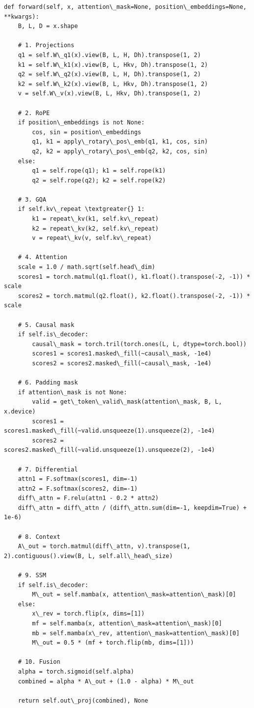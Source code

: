 \begin{lstlisting}
def forward(self, x, attention\_mask=None, position\_embeddings=None, **kwargs):
    B, L, D = x.shape
    
    # 1. Projections
    q1 = self.W\_q1(x).view(B, L, H, Dh).transpose(1, 2)
    k1 = self.W\_k1(x).view(B, L, Hkv, Dh).transpose(1, 2)
    q2 = self.W\_q2(x).view(B, L, H, Dh).transpose(1, 2)
    k2 = self.W\_k2(x).view(B, L, Hkv, Dh).transpose(1, 2)
    v = self.W\_v(x).view(B, L, Hkv, Dh).transpose(1, 2)
    
    # 2. RoPE
    if position\_embeddings is not None:
        cos, sin = position\_embeddings
        q1, k1 = apply\_rotary\_pos\_emb(q1, k1, cos, sin)
        q2, k2 = apply\_rotary\_pos\_emb(q2, k2, cos, sin)
    else:
        q1 = self.rope(q1); k1 = self.rope(k1)
        q2 = self.rope(q2); k2 = self.rope(k2)
    
    # 3. GQA
    if self.kv\_repeat \textgreater{} 1:
        k1 = repeat\_kv(k1, self.kv\_repeat)
        k2 = repeat\_kv(k2, self.kv\_repeat)
        v = repeat\_kv(v, self.kv\_repeat)
    
    # 4. Attention
    scale = 1.0 / math.sqrt(self.head\_dim)
    scores1 = torch.matmul(q1.float(), k1.float().transpose(-2, -1)) * scale
    scores2 = torch.matmul(q2.float(), k2.float().transpose(-2, -1)) * scale
    
    # 5. Causal mask
    if self.is\_decoder:
        causal\_mask = torch.tril(torch.ones(L, L, dtype=torch.bool))
        scores1 = scores1.masked\_fill(~causal\_mask, -1e4)
        scores2 = scores2.masked\_fill(~causal\_mask, -1e4)
    
    # 6. Padding mask
    if attention\_mask is not None:
        valid = get\_token\_valid\_mask(attention\_mask, B, L, x.device)
        scores1 = scores1.masked\_fill(~valid.unsqueeze(1).unsqueeze(2), -1e4)
        scores2 = scores2.masked\_fill(~valid.unsqueeze(1).unsqueeze(2), -1e4)
    
    # 7. Differential
    attn1 = F.softmax(scores1, dim=-1)
    attn2 = F.softmax(scores2, dim=-1)
    diff\_attn = F.relu(attn1 - 0.2 * attn2)
    diff\_attn = diff\_attn / (diff\_attn.sum(dim=-1, keepdim=True) + 1e-6)
    
    # 8. Context
    A\_out = torch.matmul(diff\_attn, v).transpose(1, 2).contiguous().view(B, L, self.all\_head\_size)
    
    # 9. SSM
    if self.is\_decoder:
        M\_out = self.mamba(x, attention\_mask=attention\_mask)[0]
    else:
        x\_rev = torch.flip(x, dims=[1])
        mf = self.mamba(x, attention\_mask=attention\_mask)[0]
        mb = self.mamba(x\_rev, attention\_mask=attention\_mask)[0]
        M\_out = 0.5 * (mf + torch.flip(mb, dims=[1]))
    
    # 10. Fusion
    alpha = torch.sigmoid(self.alpha)
    combined = alpha * A\_out + (1.0 - alpha) * M\_out
    
    return self.out\_proj(combined), None
\end{lstlisting}

